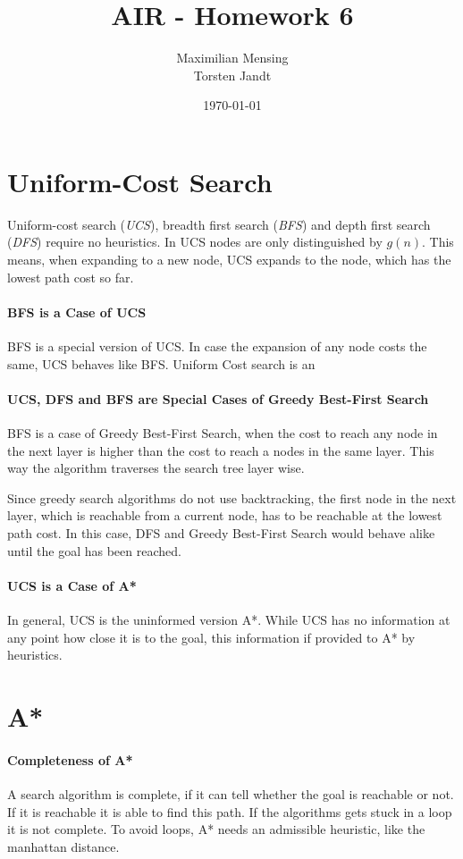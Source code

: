 \documentclass[a4paper,headsepline,12pt]{scrartcl}
\title{AIR - Homework 6}
\date{\today}
\author{Maximilian Mensing\\Torsten Jandt}
\begin{document}
\maketitle{}
\section{Uniform-Cost Search}
Uniform-cost search (\emph{UCS}), breadth first search (\emph{BFS}) and depth first search (\emph{DFS}) require no heuristics. In UCS nodes are only distinguished by \( g(n)\). This means, when expanding to a new node, UCS expands to the node, which has the lowest path cost so far.
\paragraph{BFS is a Case of UCS}
BFS is a special version of UCS. In case the expansion of any node costs the same, UCS behaves like BFS.
Uniform Cost search is an 

\paragraph{UCS, DFS and BFS are Special Cases of Greedy Best-First Search}
BFS is a case of Greedy Best-First Search, when the cost to reach any node in the next layer is higher than the cost to reach a nodes in the same layer. This way the algorithm traverses the search tree layer wise. 

Since greedy search algorithms do not use backtracking, the first node in the next layer, which is reachable from a current node, has to be reachable at the lowest path cost. In this case, DFS and  Greedy Best-First Search would behave alike until the goal has been reached. 

\paragraph{UCS is a Case of A*}
In general, UCS is the uninformed version A*. While UCS has no information at any point how close it is to the goal, this information if provided to A* by heuristics.

\newpage
\section{A*}
\paragraph{Completeness of A*} A search algorithm is complete, if it can tell whether the goal is reachable or not. If it is reachable it is able to find this path. If the algorithms gets stuck in a loop it is not complete. To avoid loops, A* needs an admissible heuristic, like the manhattan distance. 
\end{document}
